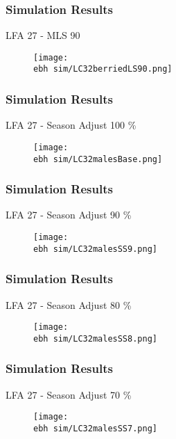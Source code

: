 \documentclass{beamer}
\newcommand{\ebh}{\string~/bio.data/bio.lobster/figures/LFA2733Framework2018/} %
\begin{document}
\begin{frame}
\frametitle{Simulation Results}
LFA 27 - MLS 90
\begin{figure}
        \begin{center}
            \texttt{[image: \\ebh sim/LC32berriedLS90.png]}
        \end{center}
    \end{figure}
\end{frame}




\begin{frame}
\frametitle{Simulation Results}
LFA 27 - Season Adjust 100 \%
\begin{figure}
        \begin{center}
            \texttt{[image: \\ebh sim/LC32malesBase.png]}
        \end{center}
    \end{figure}
\end{frame}


\begin{frame}
\frametitle{Simulation Results}
LFA 27 - Season Adjust 90 \%
\begin{figure}
        \begin{center}
            \texttt{[image: \\ebh sim/LC32malesSS9.png]}
        \end{center}
    \end{figure}
\end{frame}


\begin{frame}
\frametitle{Simulation Results}
LFA 27 - Season Adjust 80 \%
\begin{figure}
        \begin{center}
            \texttt{[image: \\ebh sim/LC32malesSS8.png]}
        \end{center}
    \end{figure}
\end{frame}


\begin{frame}
\frametitle{Simulation Results}
LFA 27 - Season Adjust 70 \%
\begin{figure}
        \begin{center}
            \texttt{[image: \\ebh sim/LC32malesSS7.png]}
        \end{center}
    \end{figure}
\end{frame}
\end{document}
